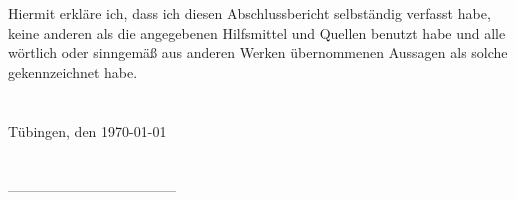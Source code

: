 Hiermit erkläre ich, dass ich diesen Abschlussbericht selbständig verfasst habe, keine anderen als die angegebenen Hilfsmittel und Quellen benutzt habe und alle wörtlich oder sinngemäß aus anderen Werken übernommenen Aussagen als solche gekennzeichnet habe.\\
\\
\\
Tübingen, den \today
\\
\\
\\
------------------------------------\\
\textsc{\large \vorname \space \name}